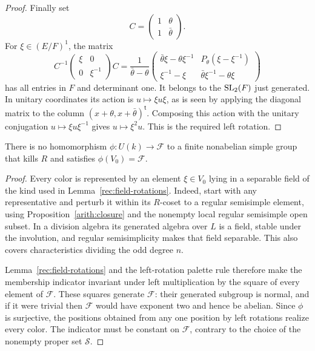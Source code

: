 \begin{proof}
Finally set
\[
 C=\begin{pmatrix}1&\theta\\1&\bar\theta\end{pmatrix}.
\]
For \(\xi\in(E/F)^1\), the matrix
\begin{equation}\label{rec:cayley-diagonal}
 C^{-1}\begin{pmatrix}\xi&0\\0&\xi^{-1}\end{pmatrix}C
 =\frac1{\bar\theta-\theta}
 \begin{pmatrix}
 \bar\theta\xi-\theta\xi^{-1}&P_\theta(\xi-\xi^{-1})\\
 \xi^{-1}-\xi&\bar\theta\xi^{-1}-\theta\xi
 \end{pmatrix}
\end{equation}
has all entries in \(F\) and determinant one.  It belongs to the
\(\operatorname{SL}_2(F)\) just generated.  In unitary coordinates its action is
\(u\mapsto\xi u\xi\), as is seen by applying the diagonal matrix to
the column \((x+\theta,x+\bar\theta)^{\mathsf t}\).  Composing this
action with the unitary conjugation \(u\mapsto\xi u\xi^{-1}\)
gives \(u\mapsto\xi^2u\).  This is the required left rotation.
\end{proof}

\begin{proposition}\label{rec:no-simple-colors}
There is no homomorphism \(\phi:U(k)\to\mathcal F\) to a finite
nonabelian simple group that kills \(R\) and satisfies
\(\phi(V_0)=\mathcal F\).
\end{proposition}

\begin{proof}
Every color is represented by an element \(\xi\in V_0\) lying in a
separable field of the kind used in Lemma~\ref{rec:field-rotations}.
Indeed, start with any representative and perturb it within its
\(R\)-coset to a regular semisimple element, using
Proposition~\ref{arith:closure} and the nonempty local regular semisimple
open subset.  In a division algebra its generated algebra over \(L\)
is a field, stable under the involution, and regular semisimplicity
makes that field separable.  This also covers characteristics dividing
the odd degree \(n\).

Lemma~\ref{rec:field-rotations} and the left-rotation palette rule
therefore make the membership indicator invariant under left
multiplication by the square of every element of \(\mathcal F\).
These squares generate \(\mathcal F\): their generated subgroup is
normal, and if it were trivial then \(\mathcal F\) would have exponent
two and hence be abelian.  Since \(\phi\) is surjective, the positions
obtained from any one position by left rotations realize every color.
The indicator must be constant on \(\mathcal F\), contrary to the
choice of the nonempty proper set \(\mathcal S\).
\end{proof}

